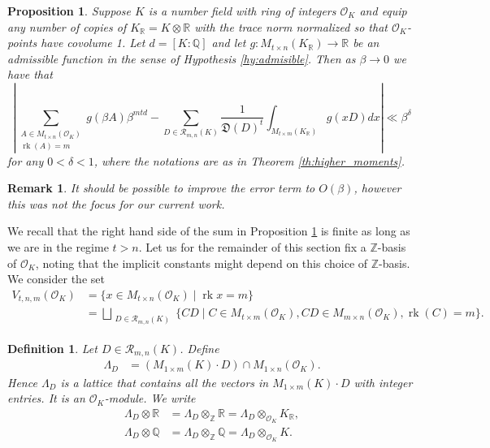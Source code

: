 \documentclass{amsart}
\newtheorem{proposition}[theorem]{Proposition}
\newtheorem{definition}[theorem]{Definition}
\newtheorem{remark}[theorem]{Remark}
\newcommand{\OK}{\mathcal{O}_K}
\DeclareMathOperator{\rank}{rk}
\begin{document}
\begin{proposition}
\label{pr:convergence}
	Suppose $K$ is a number field with ring of integers $\OK$ and equip any number of copies of $K_\mathbb{R} = K \otimes \mathbb{R}$ with the trace norm normalized so that $\OK$-points have covolume 1. Let $d=[K:\mathbb{Q}]$ and let $g:M_{t \times n}(K_\mathbb{R}) \rightarrow \mathbb{R}$ be an admissible function in the sense of Hypothesis \ref{hy:admisible}. Then as $\beta \rightarrow 0$ we have that 
	\begin{equation}
	  \left| \sum_{\substack{A \in M_{t \times n}(\OK) \\ \rank(A)=m}} g(\beta A) \beta^{mtd}  -  \sum_{D \in \mathcal{R}_{m,n}(K)}  \frac{1}{\mathfrak{D}(D)^{t}}\int_{M_{t \times m}(K_\mathbb{R})} g(x D) dx\right| \ll \beta^\delta
	\end{equation}
	for any $0<\delta<1$, where the notations are as in Theorem \ref{th:higher_moments}.
\end{proposition}
\begin{remark}
\label{re:rate_of_convergence}
It should be possible to improve the error term to $O(\beta)$, however this was not the focus for our current work.
\end{remark}

We recall that the right hand side of the sum in Proposition \ref{pr:convergence} is
finite as long as we are in the regime $t>n$. Let us for the remainder of this section fix a $\mathbb{Z}$-basis of $\OK$, noting that the implicit constants might depend on this choice of $\mathbb{Z}$-basis. We consider the set 
\begin{align}
	V_{t,n,m}(\mathcal{O}_K) & = \{ x \in M_{t \times n}(\OK) \mid \rank x = m  \} \\
	 & = \bigsqcup_{\substack{ D \in \mathcal{R}_{m,n}(K)}} 
 \{  CD \mid C \in M_{t \times m}(\OK) ,   CD \in M_{m \times n}(\mathcal{O}_K) , \rank (C) = m\}.
\end{align}

\begin{definition}
Let $D \in \mathcal{R}_{m,n}(K)$.
Define
\begin{align}
\Lambda_D &  = ( M_{1 \times m}(K)\cdot D ) \cap M_{1 \times n}(\OK).
\end{align}
Hence $\Lambda_D$ is a lattice that contains all the vectors in $M_{1 \times m}(K) \cdot D$ with integer entries. It is an $\OK$-module. We write 
\begin{align}
	\Lambda_D \otimes \mathbb{R} & = \Lambda_D \otimes_{\mathbb{Z}} \mathbb{R} = \Lambda_D \otimes _{\OK} K_{\mathbb{R}},\\
	\Lambda_D \otimes \mathbb{Q} & = \Lambda_D \otimes_{\mathbb{Z}} \mathbb{Q}  = \Lambda_D \otimes_{\OK } K .
\end{align}
\end{definition}
\end{document}
